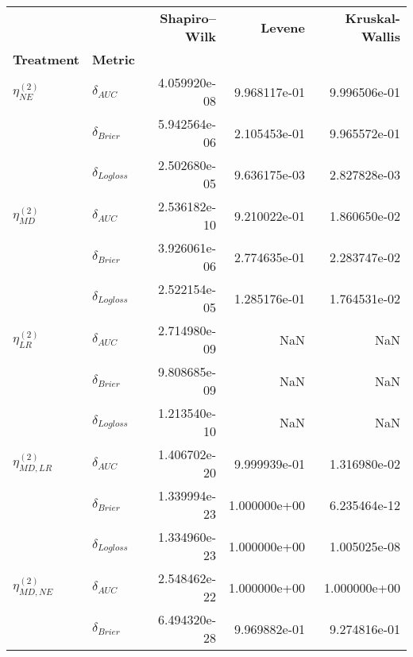     
    \begin{table}[!h]
    \centering
    \begin{tabular}{l|lrrr}
    \toprule
                              &                    &  \textbf{Shapiro–Wilk} &  \textbf{Levene} &  \textbf{Kruskal-Wallis} \\
    \textbf{Treatment} & \textbf{Metric} &                        &                  &                          \\
    \midrule
    $\eta^{(2)}_{NE}$ & $\delta_{AUC}$ &           4.059920e-08 &     9.968117e-01 &             9.996506e-01 \\
                              & $\delta_{Brier}$ &           5.942564e-06 &     2.105453e-01 &             9.965572e-01 \\
                              & $\delta_{Logloss}$ &           2.502680e-05 &     9.636175e-03 &             2.827828e-03 \\
    $\eta^{(2)}_{MD}$ & $\delta_{AUC}$ &           2.536182e-10 &     9.210022e-01 &             1.860650e-02 \\
                              & $\delta_{Brier}$ &           3.926061e-06 &     2.774635e-01 &             2.283747e-02 \\
                              & $\delta_{Logloss}$ &           2.522154e-05 &     1.285176e-01 &             1.764531e-02 \\
    $\eta^{(2)}_{LR}$ & $\delta_{AUC}$ &           2.714980e-09 &              NaN &                      NaN \\
                              & $\delta_{Brier}$ &           9.808685e-09 &              NaN &                      NaN \\
                              & $\delta_{Logloss}$ &           1.213540e-10 &              NaN &                      NaN \\
    $\eta^{(2)}_{MD, LR}$ & $\delta_{AUC}$ &           1.406702e-20 &     9.999939e-01 &             1.316980e-02 \\
                              & $\delta_{Brier}$ &           1.339994e-23 &     1.000000e+00 &             6.235464e-12 \\
                              & $\delta_{Logloss}$ &           1.334960e-23 &     1.000000e+00 &             1.005025e-08 \\
    $\eta^{(2)}_{MD, NE}$ & $\delta_{AUC}$ &           2.548462e-22 &     1.000000e+00 &             1.000000e+00 \\
                              & $\delta_{Brier}$ &           6.494320e-28 &     9.969882e-01 &             9.274816e-01 \\

\end{tabular}
\end{table}
